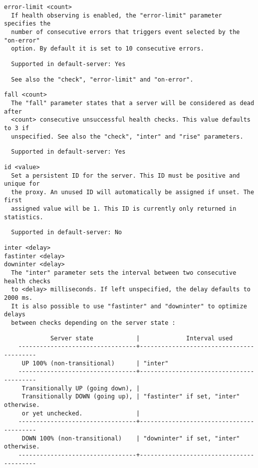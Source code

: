 \begin{verbatim}
error-limit <count>
  If health observing is enabled, the "error-limit" parameter specifies the
  number of consecutive errors that triggers event selected by the "on-error"
  option. By default it is set to 10 consecutive errors.
\end{verbatim}

\begin{verbatim}
  Supported in default-server: Yes
\end{verbatim}

\begin{verbatim}
  See also the "check", "error-limit" and "on-error".
\end{verbatim}

\begin{verbatim}
fall <count>
  The "fall" parameter states that a server will be considered as dead after
  <count> consecutive unsuccessful health checks. This value defaults to 3 if
  unspecified. See also the "check", "inter" and "rise" parameters.
\end{verbatim}

\begin{verbatim}
  Supported in default-server: Yes
\end{verbatim}

\begin{verbatim}
id <value>
  Set a persistent ID for the server. This ID must be positive and unique for
  the proxy. An unused ID will automatically be assigned if unset. The first
  assigned value will be 1. This ID is currently only returned in statistics.
\end{verbatim}

\begin{verbatim}
  Supported in default-server: No
\end{verbatim}

\begin{verbatim}
inter <delay>
fastinter <delay>
downinter <delay>
  The "inter" parameter sets the interval between two consecutive health checks
  to <delay> milliseconds. If left unspecified, the delay defaults to 2000 ms.
  It is also possible to use "fastinter" and "downinter" to optimize delays
  between checks depending on the server state :
\end{verbatim}

\begin{verbatim}
             Server state            |             Interval used
    ---------------------------------+-----------------------------------------
     UP 100% (non-transitional)      | "inter"
    ---------------------------------+-----------------------------------------
     Transitionally UP (going down), |
     Transitionally DOWN (going up), | "fastinter" if set, "inter" otherwise.
     or yet unchecked.               |
    ---------------------------------+-----------------------------------------
     DOWN 100% (non-transitional)    | "downinter" if set, "inter" otherwise.
    ---------------------------------+-----------------------------------------
\end{verbatim}

